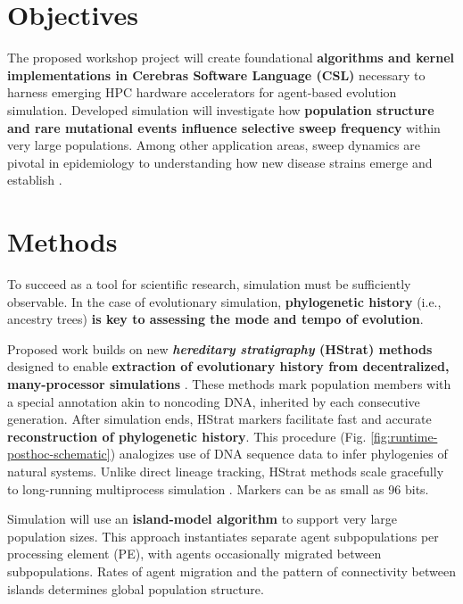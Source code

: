 \section{Objectives}

The proposed workshop project will create foundational \textbf{algorithms and kernel implementations in Cerebras Software Language (CSL)} necessary to harness emerging HPC hardware accelerators for agent-based evolution simulation.
Developed simulation will investigate how \textbf{population structure and rare mutational events influence selective sweep frequency} within very large populations.
Among other application areas, sweep dynamics are pivotal in epidemiology to understanding how new disease strains emerge and establish \cite{markov2023evolution}.

\section{Methods}

To succeed as a tool for scientific research, simulation must be sufficiently observable.
In the case of evolutionary simulation, \textbf{phylogenetic history} (i.e., ancestry trees) \textbf{is key to assessing the mode and tempo of evolution}.



Proposed work builds on new \textbf{\textit{hereditary stratigraphy} (HStrat) methods} designed to enable \textbf{extraction of evolutionary history from decentralized, many-processor simulations} \cite{moreno2022hstrat}.
These methods mark population members with a special annotation akin to noncoding DNA, inherited by each consecutive generation.
After simulation ends, HStrat markers facilitate fast and accurate \textbf{reconstruction of phylogenetic history}.
This procedure (Fig. \ref{fig:runtime-posthoc-schematic}) analogizes use of DNA sequence data to infer phylogenies of natural systems.
Unlike direct lineage tracking, HStrat methods scale gracefully to long-running multiprocess simulation \cite{moreno2024analysis}.
Markers can be as small as 96 bits.

Simulation will use an \textbf{island-model algorithm} to support very large population sizes.
This approach instantiates separate agent subpopulations per processing element (PE), with agents occasionally migrated between subpopulations.
Rates of agent migration and the pattern of connectivity between islands determines global population structure.

